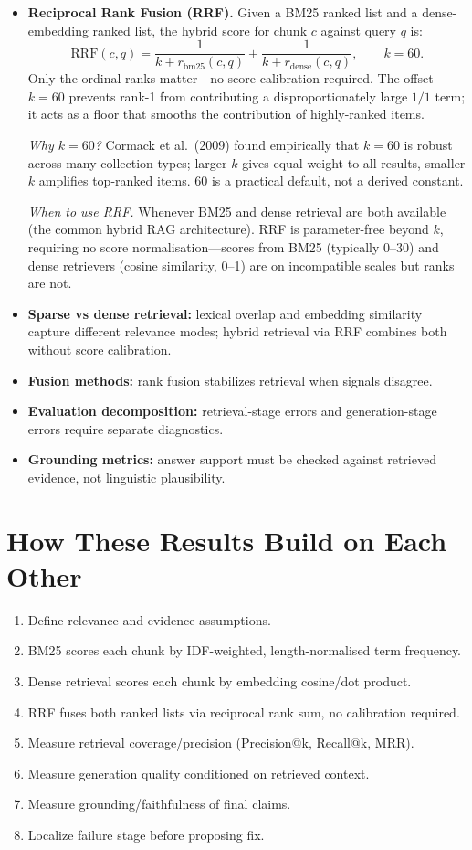 \begin{itemize}[leftmargin=1.5em]
  \item \textbf{Reciprocal Rank Fusion (RRF).}
  Given a BM25 ranked list and a dense-embedding ranked list, the hybrid score for chunk $c$ against query $q$ is:
  \[
    \mathrm{RRF}(c,q) = \frac{1}{k + r_{\mathrm{bm25}}(c,q)} + \frac{1}{k + r_{\mathrm{dense}}(c,q)},
    \qquad k = 60.
  \]
  Only the ordinal ranks matter---no score calibration required. The offset $k=60$ prevents rank-1 from contributing a disproportionately large $1/1$ term; it acts as a floor that smooths the contribution of highly-ranked items.

  \emph{Why $k=60$?} Cormack et al.\ (2009) found empirically that $k=60$ is robust across many collection types; larger $k$ gives equal weight to all results, smaller $k$ amplifies top-ranked items. 60 is a practical default, not a derived constant.

  \emph{When to use RRF.} Whenever BM25 and dense retrieval are both available (the common hybrid RAG architecture). RRF is parameter-free beyond $k$, requiring no score normalisation---scores from BM25 (typically 0--30) and dense retrievers (cosine similarity, 0--1) are on incompatible scales but ranks are not.

  \item \textbf{Sparse vs dense retrieval:} lexical overlap and embedding similarity capture different relevance modes; hybrid retrieval via RRF combines both without score calibration.
  \item \textbf{Fusion methods:} rank fusion stabilizes retrieval when signals disagree.
  \item \textbf{Evaluation decomposition:} retrieval-stage errors and generation-stage errors require separate diagnostics.
  \item \textbf{Grounding metrics:} answer support must be checked against retrieved evidence, not linguistic plausibility.
\end{itemize}

\section*{How These Results Build on Each Other}
\begin{enumerate}[leftmargin=1.5em]
  \item Define relevance and evidence assumptions.
  \item BM25 scores each chunk by IDF-weighted, length-normalised term frequency.
  \item Dense retrieval scores each chunk by embedding cosine/dot product.
  \item RRF fuses both ranked lists via reciprocal rank sum, no calibration required.
  \item Measure retrieval coverage/precision (Precision@k, Recall@k, MRR).
  \item Measure generation quality conditioned on retrieved context.
  \item Measure grounding/faithfulness of final claims.
  \item Localize failure stage before proposing fix.
\end{enumerate}

